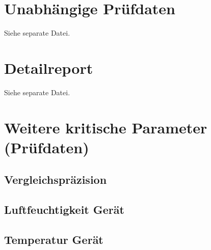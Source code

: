 \documentclass[11pt, a4paper]{article}
\begin{document}
\appendix

\section{Unabhängige Prüfdaten}
Siehe separate Datei.


\section{Detailreport}
Siehe separate Datei.

\section{Weitere kritische Parameter (Prüfdaten)}


\subsection{Vergleichspräzision}
\label{sec:Vergleichspräzision}

\subsection{Luftfeuchtigkeit Gerät}

\subsection{Temperatur Gerät}
\end{document}
